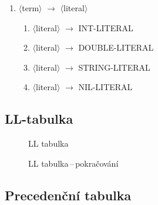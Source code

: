 \documentclass[11pt]{article}
\newcommand{\red}[1]{{\color{red} #1}}
\begin{document}
\begin{enumerate}[label=\arabic*., ref=\arabic*]
\item $\langle$term$\rangle$ $\rightarrow$ $\langle$literal$\rangle$
\begin{enumerate}[label=\arabic{enumi}.\arabic*., ref=\arabic{enumi}.\arabic*]
    \item $\langle$literal$\rangle$ $\rightarrow$ \red{INT-LITERAL}
    \item $\langle$literal$\rangle$ $\rightarrow$ \red{DOUBLE-LITERAL}
    \item $\langle$literal$\rangle$ $\rightarrow$ \red{STRING-LITERAL}
    \item $\langle$literal$\rangle$ $\rightarrow$ \red{NIL-LITERAL}
\end{enumerate}
\end{enumerate}



\begin{landscape}
    \subsection{LL-tabulka}
    \thispagestyle{empty}
    \begin{figure}[ht]
        \begin{center}
        \end{center}
        \caption{LL tabulka}
    \end{figure}
\end{landscape}

\begin{landscape}
    \thispagestyle{empty}
    \begin{figure}[ht]
        \begin{center}
        \end{center}
        \caption{LL tabulka\,--\,pokračování}
    \end{figure}
\end{landscape}


\subsection{Precedenční tabulka}
\end{document}
